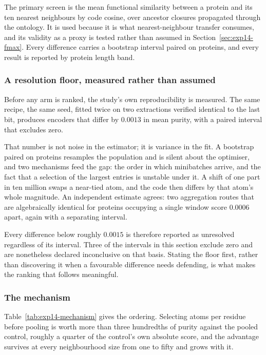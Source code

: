 The primary screen is the mean functional similarity between a protein and its ten
nearest neighbours by code cosine, over ancestor closures propagated through the
ontology. It is used because it is what nearest-neighbour transfer consumes, and its
validity as a proxy is tested rather than assumed in
Section~\ref{sec:exp14-fmax}. Every difference carries a bootstrap interval paired on
proteins, and every result is reported by protein length band.

\subsubsection{A resolution floor, measured rather than assumed}
\label{sec:exp14-floor}

Before any arm is ranked, the study's own reproducibility is measured. The same
recipe, the same seed, fitted twice on two extractions verified identical to the
last bit, produces encoders that differ by $0.0013$ in mean purity, with a paired
interval that excludes zero.

That number is not noise in the estimator; it is variance in the fit. A bootstrap
paired on proteins resamples the population and is silent about the optimiser, and
two mechanisms feed the gap: the order in which minibatches arrive, and the fact that
a selection of the largest entries is unstable under it. A shift of one part in ten
million swaps a near-tied atom, and the code then differs by that atom's whole
magnitude. An independent estimate agrees: two aggregation routes that are
algebraically identical for proteins occupying a single window score $0.0006$ apart,
again with a separating interval.

Every difference below roughly $0.0015$ is therefore reported as unresolved
regardless of its interval. Three of the intervals in this section exclude zero and
are nonetheless declared inconclusive on that basis. Stating the floor first, rather
than discovering it when a favourable difference needs defending, is what makes the
ranking that follows meaningful.

\subsubsection{The mechanism}

Table~\ref{tab:exp14-mechanism} gives the ordering. Selecting atoms per residue
before pooling is worth more than three hundredths of purity against the pooled
control, roughly a quarter of the control's own absolute score, and the advantage
survives at every neighbourhood size from one to fifty and grows with it.

